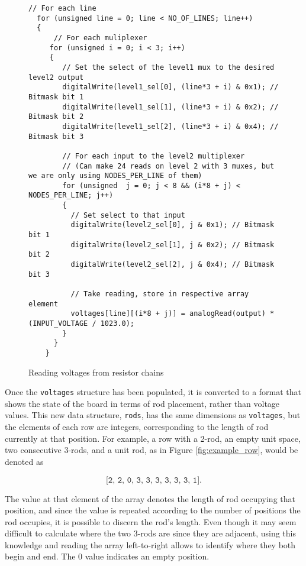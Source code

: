 \begin{figure}[H]
\centering
\begin{verbatim}
// For each line
  for (unsigned line = 0; line < NO_OF_LINES; line++)
  {
      // For each muliplexer
     for (unsigned i = 0; i < 3; i++)
     {
        // Set the select of the level1 mux to the desired level2 output
        digitalWrite(level1_sel[0], (line*3 + i) & 0x1); // Bitmask bit 1
        digitalWrite(level1_sel[1], (line*3 + i) & 0x2); // Bitmask bit 2
        digitalWrite(level1_sel[2], (line*3 + i) & 0x4); // Bitmask bit 3

        // For each input to the level2 multiplexer
        // (Can make 24 reads on level 2 with 3 muxes, but we are only using NODES_PER_LINE of them)
        for (unsigned  j = 0; j < 8 && (i*8 + j) < NODES_PER_LINE; j++) 
        {
          // Set select to that input
          digitalWrite(level2_sel[0], j & 0x1); // Bitmask bit 1
          digitalWrite(level2_sel[1], j & 0x2); // Bitmask bit 2
          digitalWrite(level2_sel[2], j & 0x4); // Bitmask bit 3

          // Take reading, store in respective array element
          voltages[line][(i*8 + j)] = analogRead(output) * (INPUT_VOLTAGE / 1023.0);
        }
      }
    }
\end{verbatim}
\caption{Reading voltages from resistor chains}
\label{lst:read_voltages}
\end{figure}

Once the \texttt{voltages} structure has been populated, it is converted to a format that shows the state of the board in terms of rod placement, rather than voltage values. This new data structure, \texttt{rods}, has the same dimensions as \texttt{voltages}, but the elements of each row are integers, corresponding to the length of rod currently at that position. For example, a row with a 2-rod, an empty unit space, two consecutive 3-rods, and a unit rod, as in Figure \ref{fig:example_row}, would be denoted as 


$$\texttt{[2, 2, 0, 3, 3, 3, 3, 3, 3, 1].}$$


The value at that element of the array denotes the length of rod occupying that position, and since the value is repeated according to the number of positions the rod occupies, it is possible to discern the rod's length. Even though it may seem difficult to calculate where the two 3-rods are since they are adjacent, using this knowledge and reading the array left-to-right allows to identify where they both begin and end. The 0 value indicates an empty position. \\

